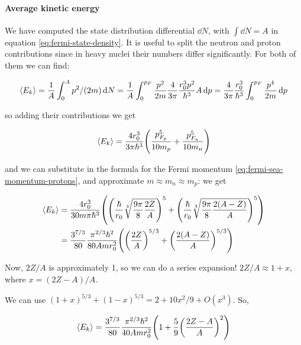 \documentclass[main.tex]{subfiles}
\begin{document}
\paragraph{Average kinetic energy}

We have computed the state distribution differential \(\dd{N} \), with \(\int   \dd{N}  = A\) in equation \eqref{eq:fermi-state-density}. It is useful to split the neutron and proton contributions since in heavy nuclei their numbers differ significantly.
For both of them we can find:

\begin{equation}
    \expval{E_k}
    = \frac{1}{A} \int _{0}   ^{A} p^2 /(2m) \dd{N}
    = \frac{1}{A} \int _{0}   ^{p_F} \frac{p^2}{2m} \frac{4}{3 \pi} \frac{r_0^3 p^2}{\hbar^3} A \dd{p}
    = \frac{4}{3 \pi} \frac{r_0^3 }{\hbar^3} \int _{0}   ^{p_F} \frac{p^4}{2m} \dd{p}
\end{equation}

so adding their contributions we get

\begin{equation}
    \expval{E_k} = \frac{4 r_0^3}{3 \pi \hbar^3} \qty(\frac{p_{F_p}^5}{10 m_p} + \frac{p_{F_n}^5}{10 m_n})
\end{equation}

and we can substitute in the formula for the Fermi momentum \eqref{eq:fermi-sea-momentum-protons}, and approximate \(m \approx  m_n \approx  m_p\): we get

\begin{subequations}
\begin{align}
    \expval{E_k}
    &= \frac{4 r_0^3}{30 m \pi \hbar^3} \qty(\qty(\frac{\hbar}{r_0} \sqrt[3]{\frac{9 \pi }{8} \frac{2Z}{A}})^5 + \qty(\frac{\hbar}{r_0} \sqrt[3]{\frac{9 \pi }{8} \frac{2(A-Z)}{A}})^5)  \\
    &= \frac{3^{7/3}}{80} \frac{\pi^{2/3} \hbar^2}{80 Am r_0^2} \qty(\qty(\frac{2Z}{A})^{5/3} + \qty(\frac{2(A-Z)}{A})^{5/3})
\end{align}
\end{subequations}

Now, \(2Z/A\) is approximately 1, so we can do a series expansion! \(2Z/A \approx 1+x\), where \(x = (2Z-A)/A\).

We can use \((1+x)^{5/3} + (1-x)^{5/3} = 2 + 10x^2/9 + O(x^3)\). So,

\begin{equation}
    \expval{E_k} =  \frac{3^{7/3}}{80} \frac{\pi^{2/3} \hbar^2}{40 Am r_0^2} \qty(1 + \frac{5}{9} \qty(\frac{2Z-A}{A})^2)
\end{equation}
\end{document}
